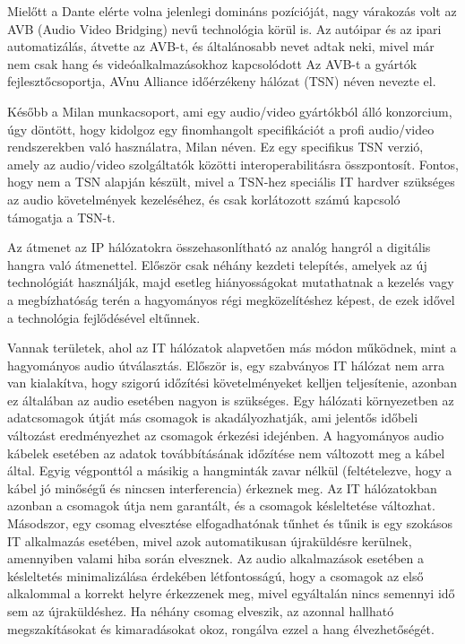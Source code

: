 Mielőtt a Dante elérte volna jelenlegi domináns pozícióját, nagy várakozás volt az AVB
(Audio Video Bridging) nevű technológia körül is.
Az autóipar és az ipari automatizálás, átvette az AVB-t, és
általánosabb nevet adtak neki, mivel már nem csak hang és videóalkalmazásokhoz kapcsolódott
Az AVB-t a gyártók fejlesztőcsoportja, AVnu Alliance időérzékeny hálózat (TSN) néven nevezte el.

Később a Milan munkacsoport, ami egy audio/video gyártókból álló konzorcium, úgy
döntött, hogy kidolgoz egy finomhangolt specifikációt a profi audio/video
rendszerekben való használatra, Milan néven.
Ez egy specifikus TSN verzió, amely az audio/video szolgáltatók közötti interoperabilitásra összpontosít.
Fontos, hogy nem a TSN alapján készült, mivel a TSN-hez speciális IT hardver szükséges az audio
követelmények kezeléséhez, és csak korlátozott számú kapcsoló támogatja a TSN-t.

Az átmenet az IP hálózatokra összehasonlítható az analóg hangról a digitális
hangra való átmenettel. Először csak néhány kezdeti telepítés, amelyek az új technológiát
használják, majd esetleg hiányosságokat mutathatnak a kezelés vagy a megbízhatóság
terén a hagyományos régi megközelítéshez képest, de ezek idővel a technológia fejlődésével eltűnnek. 

Vannak területek, ahol az IT hálózatok alapvetően más módon működnek, mint a hagyományos audio útválasztás.
Először is, egy szabványos IT hálózat nem arra van kialakítva, hogy szigorú időzítési követelményeket kelljen teljesítenie, 
azonban ez általában az audio esetében nagyon is szükséges.
Egy hálózati környezetben az adatcsomagok útját más csomagok is akadályozhatják, ami jelentős
időbeli változást eredményezhet az csomagok érkezési idejénben.
A hagyományos audio kábelek esetében az adatok továbbításának időzítése nem változott meg a kábel által.
Egyig végponttól a másikig a hangminták zavar nélkül (feltételezve, hogy a kábel jó minőségű és nincsen interferencia) 
érkeznek meg. Az IT hálózatokban azonban a csomagok útja nem garantált, és a csomagok késleltetése változhat.
Másodszor, egy csomag elvesztése elfogadhatónak tűnhet és tűnik is egy szokásos IT
alkalmazás esetében, mivel azok automatikusan újraküldésre kerülnek, amennyiben valami hiba során elvesznek.
Az audio alkalmazások esetében a késleltetés minimalizálása érdekében
létfontosságú, hogy a csomagok az első alkalommal a korrekt helyre érkezzenek meg, mivel egyáltalán nincs semennyi
idő sem az újraküldéshez. Ha néhány csomag elveszik, az azonnal hallható megszakításokat és kimaradásokat okoz,
rongálva ezzel a hang élvezhetőségét.

